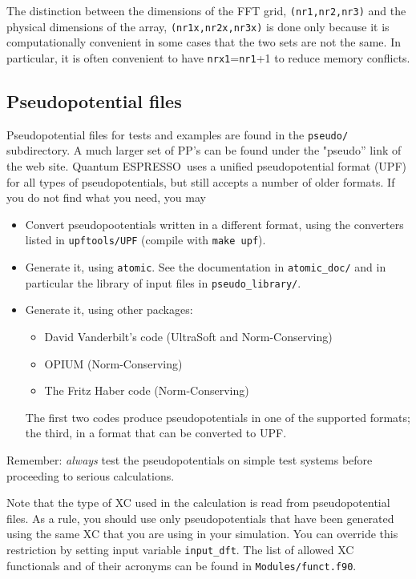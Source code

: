 \documentclass[12pt,a4paper]{article}
\def\qe{{\sc Quantum ESPRESSO}}
\begin{document}
The distinction between the dimensions of the FFT grid,
\texttt{(nr1,nr2,nr3)} and the physical dimensions of the array,
\texttt{(nr1x,nr2x,nr3x)} is done only because it is computationally
convenient in some cases that the two sets are not the same.
In particular, it is often convenient to have \texttt{nrx1}=\texttt{nr1}+1
to reduce memory conflicts.

\subsection{Pseudopotential files}
\label{SubSec:pseudo}
Pseudopotential files for tests and examples are found in the 
\texttt{pseudo/}
subdirectory. A much larger set of PP's can be found under
the "pseudo'' link of the web site. \qe\ uses a unified 
pseudopotential format (UPF) for all types of pseudopotentials, 
but still accepts a number of older formats. If you do not find 
what you need, you may
\begin{itemize}
\item Convert pseudopootentials written in a different format, 
using the converters listed in \texttt{upftools/UPF} (compile with 
\texttt{make upf}).
\item Generate it, using \texttt{atomic}. See the documentation in
\texttt{atomic\_doc/} and in particular the library of input files
in \texttt{pseudo\_library/}.
\item Generate it, using other packages:
\begin{itemize}
\item David Vanderbilt's code (UltraSoft and Norm-Conserving)
\item OPIUM (Norm-Conserving)
\item The Fritz Haber code (Norm-Conserving)
\end{itemize}
The first two codes produce pseudopotentials in one of the 
supported formats; the third, in a format that can be converted 
to UPF.
\end{itemize}
Remember: {\em always} test the pseudopotentials on simple test
systems before proceeding to serious calculations. 

Note that the type of XC used in the calculation is read from 
pseudopotential files. As a rule, you should use only 
pseudopotentials that have been generated using the same 
XC that you are using in your simulation. You can override
this restriction by setting input variable \texttt{input\_dft}. The list of
allowed XC functionals and of their acronyms can be found in 
\texttt{Modules/funct.f90}.
\end{document}
